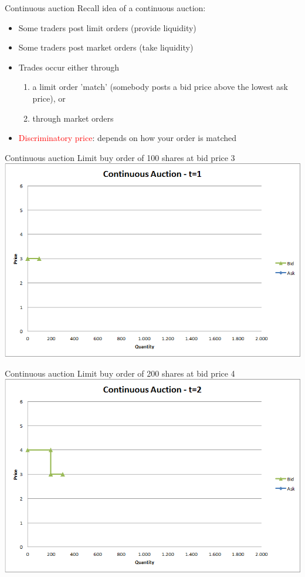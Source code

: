 \begin{frame}{Continuous auction}
	Recall idea of a continuous auction:
	\begin{itemize}
		\item Some traders post limit orders (provide liquidity)
		\item Some traders post market orders (take liquidity)
		\item Trades occur either through 
		\begin{enumerate}
			\item a limit order 'match' (somebody posts a bid price above the lowest ask price), or
			\item through market orders
		\end{enumerate}
		\item \textcolor{red}{Discriminatory price}: depends on how your order is matched
	\end{itemize}
\end{frame}


\begin{frame}{Continuous auction}
	Limit buy order of 100 shares at bid price 3
	\quad
	\center
	\includegraphics[width=.75\linewidth]{pics/Continuous_t1}
\end{frame}


\begin{frame}{Continuous auction}
	Limit buy order of 200 shares at bid price 4
	\quad
	\center
	\includegraphics[width=.75\linewidth]{pics/Continuous_t2}
\end{frame}


